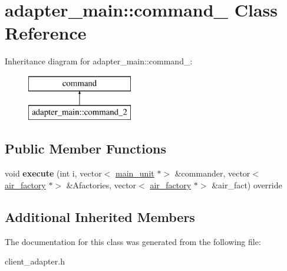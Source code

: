 \hypertarget{classadapter__main_1_1command__2}{}\section{adapter\+\_\+main\+:\+:command\+\_ Class Reference}
\label{classadapter__main_1_1command__2}
Inheritance diagram for adapter\+\_\+main\+:\+:command\+\_\+:\begin{figure}[H]
\begin{center}
\leavevmode
\includegraphics[height=2.000000cm]{classadapter__main_1_1command__2}
\end{center}
\end{figure}
\subsection*{Public Member Functions}
\begin{DoxyCompactItemize}
\item 
\mbox{\label{classadapter__main_1_1command__2_a2a2d647942a41f0aabc903bfb78b40fd}} 
void {\bfseries execute} (int i, vector$<$ \mbox{\hyperlink{classmain__unit}{main\+\_\+unit}} $\ast$$>$ \&commander, vector$<$ \mbox{\hyperlink{classair__factory}{air\+\_\+factory}} $\ast$$>$ \&Afactories, vector$<$ \mbox{\hyperlink{classair__factory}{air\+\_\+factory}} $\ast$$>$ \&air\+\_\+fact) override
\end{DoxyCompactItemize}
\subsection*{Additional Inherited Members}


The documentation for this class was generated from the following file\+:\begin{DoxyCompactItemize}
\item 
client\+\_\+adapter.\+h\end{DoxyCompactItemize}
